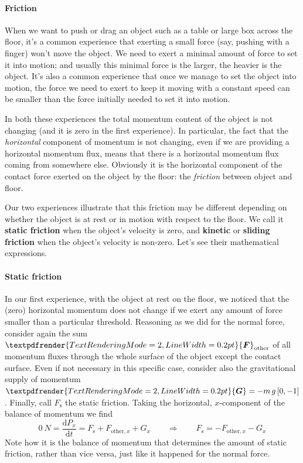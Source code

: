 \documentclass[a4paper,12pt,%
onecolumn,oneside,%
british%
]{memoir}
\renewcommand*{\bm}[1]{\textpdfrender{TextRenderingMode=2,LineWidth=0.2pt}{\boldsymbol{#1}}}
\newcommand*{\di}{\mathrm{d}}%
\renewcommand*{\|}[1][]{\nonscript\:#1\vert\nonscript\:\mathopen{}}
\newcommand*{\dt}{\di t}
\newcommand*{\ym}{m}%
\newcommand*{\yF}{\bm{F}}
\newcommand*{\yFs}{F_{\textrm{s}}}
\newcommand*{\yFr}{\yF_{\textrm{other}}}
\newcommand*{\yFrx}{F_{\textrm{other},x}}
\newcommand*{\yG}{\bm{G}}
\begin{document}
\paragraph{Friction}

When we want to push or drag an object such as a table or large box across the floor, it's a common experience that exerting a small force (say, pushing with a finger) won't move the object. We need to exert a minimal amount of force to set it into motion; and usually this minimal force is the larger, the heavier is the object. It's also a common experience that once we manage to set the object into motion, the force we need to exert to keep it moving with a constant speed can be smaller than the force initially needed to set it into motion.

In both these experiences the total momentum content of the object is not changing (and it is zero in the first experience). In particular, the fact that the \emph{horizontal} component of momentum is not changing, even if we are providing a horizontal momentum flux, means that there is a horizontal momentum flux coming from somewhere else. Obviously it is the horizontal component of the contact force exerted on the object by the floor: the \emph{friction} between object and floor.

Our two experiences illustrate that this friction may be different depending on whether the object is at rest or in motion with respect to the floor. We call it \textbf{static friction} when the object's velocity is zero, and \textbf{kinetic} or \textbf{sliding friction} when the object's velocity is non-zero. Let's see their mathematical expressions.

\paragraph{Static friction}

In our first experience, with the object at rest on the floor, we noticed that the (zero) horizontal momentum does not change if we exert any amount of force smaller than a particular threshold. Reasoning as we did for the normal force, consider again the sum $\yFr$ of all momentum fluxes through the whole surface of the object except the contact surface. Even if not necessary in this specific case, consider also the gravitational supply of momentum $\yG=-\ym\,g\,[0,-1]$. Finally, call $\yFs$ the static friction. Taking the horizontal, $x$-component of the balance of momentum we find
\begin{equation*}
  \qty{0}{N} =
  \frac{\di P_{x}}{\dt}
  = \yFs + \yFrx + G_{x}
\qquad  \Longrightarrow\qquad
  \yFs = - \yFrx - G_{x}
\end{equation*}
Note how it is the balance of momentum that determines the amount of static friction, rather than vice versa, just like it happened for the normal force.
\end{document}
